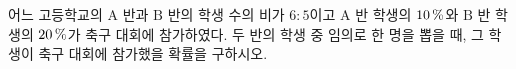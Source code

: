 어느 고등학교의 $\mathrm{A}$ 반과 $\mathrm{B}$ 반의 학생 수의 비가 $6:5$이고 $\mathrm{A}$ 반 학생의 $10\mkern3mu \%$와 $\mathrm{B}$ 반 학생의 $20\mkern3mu \%$가 축구 대회에 참가하였다. 두 반의 학생 중 임의로 한 명을 뽑을 때, 그 학생이 축구 대회에 참가했을 확률을 구하시오.
